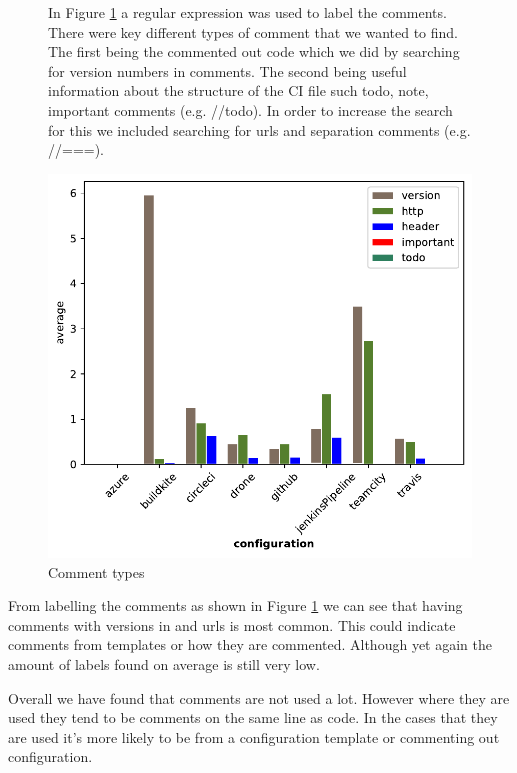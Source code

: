 \documentclass[10pt,conference]{IEEEtran}
\begin{document}
\begin{figure}[!ht]
  \centering
  \begin{minipage}[!t]{.48\textwidth}
    In Figure \ref{fig:comment_types} a regular expression was used to label the comments. There were key different types of comment that we wanted to find. The first being the commented out code which we did by searching for version numbers in comments. The second being useful information about the structure of the CI file such todo, note, important comments (e.g. //todo). In order to increase the search for this we included searching for urls and separation comments (e.g. //===).
    
  \end{minipage}%
  \hfill
  \begin{minipage}[!t]{.48\textwidth}
    \includegraphics[width=\textwidth]{../src/results/comments usage bars.pdf}
    \caption[alt text]{Comment types}
    \label{fig:comment_types}  
  \end{minipage}
\end{figure}

From labelling the comments as shown in Figure \ref{fig:comment_types} we can see that having comments with versions in and urls is most common. This could indicate comments from templates or how they are commented. Although yet again the amount of labels found on average is still very low.

Overall we have found that comments are not used a lot. However where they are used they tend to be comments on the same line as code. In the cases that they are used it's more likely to be from a configuration template or commenting out configuration. 
\end{document}
